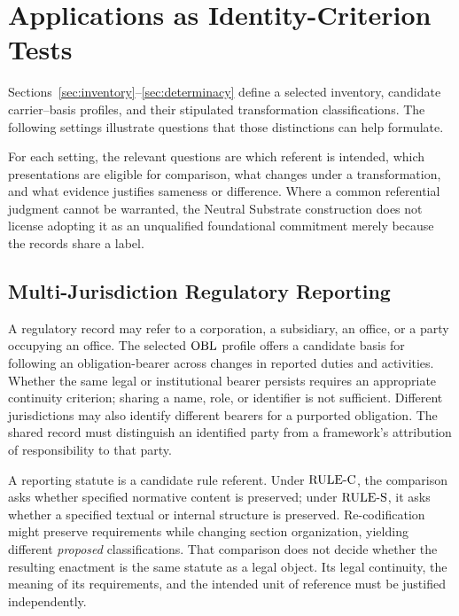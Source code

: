 
\section{Applications as Identity-Criterion Tests}
\label{sec:application}

Sections~\ref{sec:inventory}--\ref{sec:determinacy} define a selected
inventory, candidate carrier--basis profiles, and their stipulated
transformation classifications.
The following settings illustrate questions
that those distinctions can help formulate.

For each setting, the relevant questions are which referent is intended,
which presentations are eligible for comparison, what changes under a
transformation, and what evidence justifies sameness or difference.
Where a common referential judgment cannot be warranted, the Neutral
Substrate construction does not license adopting it as an unqualified
foundational commitment merely because the records share a label.

\subsection{Multi-Jurisdiction Regulatory Reporting}
\label{subsec:app_regulatory}

A regulatory record may refer to a corporation, a subsidiary, an office,
or a party occupying an office.
The selected $\mathrm{OBL}$ profile offers a
candidate basis for following an obligation-bearer across changes in
reported duties and activities.
Whether the same legal or institutional
bearer persists requires an appropriate continuity criterion; sharing a
name, role, or identifier is not sufficient.
Different jurisdictions may
also identify different bearers for a purported obligation.
The shared
record must distinguish an identified party from a framework's attribution
of responsibility to that party.

A reporting statute is a candidate rule referent.
Under $\mathrm{RULE\text{-}C}$, the
comparison asks whether specified normative content is preserved; under
$\mathrm{RULE\text{-}S}$, it asks whether a specified textual or internal structure is
preserved.
Re-codification might preserve requirements while changing
section organization, yielding different \emph{proposed} classifications.
That comparison does not decide whether the resulting enactment is the
same statute as a legal object.
Its legal continuity, the meaning of its
requirements, and the intended unit of reference must be justified
independently.

